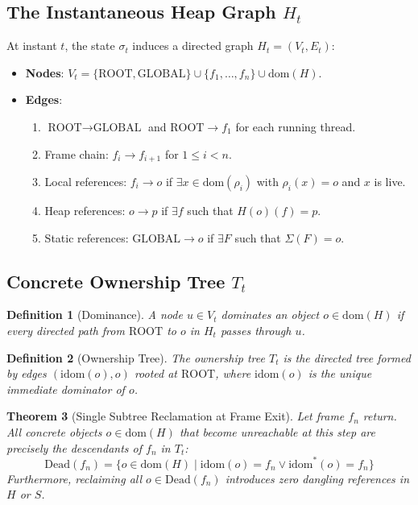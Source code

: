 \documentclass[12pt,a4paper]{article}
\newtheorem{theorem}{Theorem}[section]
\newtheorem{definition}[theorem]{Definition}
\newcommand{\GLOBAL}{\text{GLOBAL}}
\newcommand{\ROOT}{\text{ROOT}}
\newcommand{\idom}{\text{idom}}
\begin{document}
\subsection{The Instantaneous Heap Graph $H_t$}
\label{sec:heap-graph}

At instant $t$, the state $\sigma_t$ induces a directed graph $H_t = (V_t, E_t)$:
\begin{itemize}
  \item \textbf{Nodes}: $V_t = \{\ROOT, \GLOBAL\} \cup \{f_1, \ldots, f_n\} \cup \text{dom}(H)$.
  \item \textbf{Edges}:
    \begin{enumerate}
      \item $\ROOT \to \GLOBAL$ and $\ROOT \to f_1$ for each running thread.
      \item Frame chain: $f_i \to f_{i+1}$ for $1 \le i < n$.
      \item Local references: $f_i \to o$ if $\exists x \in \text{dom}(\rho_i)$ with $\rho_i(x) = o$ and $x$ is live.
      \item Heap references: $o \to p$ if $\exists f$ such that $H(o)(f) = p$.
      \item Static references: $\GLOBAL \to o$ if $\exists F$ such that $\Sigma(F) = o$.
    \end{enumerate}
\end{itemize}

\subsection{Concrete Ownership Tree $T_t$}

\begin{definition}[Dominance]
\label{def:dominance}
A node $u \in V_t$ \emph{dominates} an object $o \in \text{dom}(H)$ if every directed path from $\ROOT$ to $o$ in $H_t$ passes through $u$.
\end{definition}

\begin{definition}[Ownership Tree]
\label{def:ownership-tree}
The ownership tree $T_t$ is the directed tree formed by edges $(\idom(o), o)$ rooted at $\ROOT$, where $\idom(o)$ is the unique immediate dominator of $o$.
\end{definition}

\begin{theorem}[Single Subtree Reclamation at Frame Exit]
\label{thm:subtree-reclamation}
Let frame $f_n$ return. All concrete objects $o \in \text{dom}(H)$ that become unreachable at this step are precisely the descendants of $f_n$ in $T_t$:
\[
\text{Dead}(f_n) = \{o \in \text{dom}(H) \mid \idom(o) = f_n \lor \idom^*(o) = f_n\}
\]
Furthermore, reclaiming all $o \in \text{Dead}(f_n)$ introduces zero dangling references in $H$ or $S$.
\end{theorem}
\end{document}
